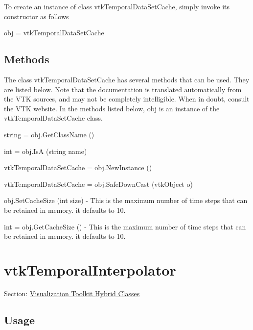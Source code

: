 To create an instance of class vtk\-Temporal\-Data\-Set\-Cache, simply invoke its constructor as follows \begin{DoxyVerb}  obj = vtkTemporalDataSetCache
\end{DoxyVerb}
 \hypertarget{vtkwidgets_vtkxyplotwidget_Methods}{}\subsection{Methods}\label{vtkwidgets_vtkxyplotwidget_Methods}
The class vtk\-Temporal\-Data\-Set\-Cache has several methods that can be used. They are listed below. Note that the documentation is translated automatically from the V\-T\-K sources, and may not be completely intelligible. When in doubt, consult the V\-T\-K website. In the methods listed below, {\ttfamily obj} is an instance of the vtk\-Temporal\-Data\-Set\-Cache class. 
\begin{DoxyItemize}
\item {\ttfamily string = obj.\-Get\-Class\-Name ()}  
\item {\ttfamily int = obj.\-Is\-A (string name)}  
\item {\ttfamily vtk\-Temporal\-Data\-Set\-Cache = obj.\-New\-Instance ()}  
\item {\ttfamily vtk\-Temporal\-Data\-Set\-Cache = obj.\-Safe\-Down\-Cast (vtk\-Object o)}  
\item {\ttfamily obj.\-Set\-Cache\-Size (int size)} -\/ This is the maximum number of time steps that can be retained in memory. it defaults to 10.  
\item {\ttfamily int = obj.\-Get\-Cache\-Size ()} -\/ This is the maximum number of time steps that can be retained in memory. it defaults to 10.  
\end{DoxyItemize}\hypertarget{vtkhybrid_vtktemporalinterpolator}{}\section{vtk\-Temporal\-Interpolator}\label{vtkhybrid_vtktemporalinterpolator}
Section\-: \hyperlink{sec_vtkhybrid}{Visualization Toolkit Hybrid Classes} \hypertarget{vtkwidgets_vtkxyplotwidget_Usage}{}\subsection{Usage}\label{vtkwidgets_vtkxyplotwidget_Usage}
